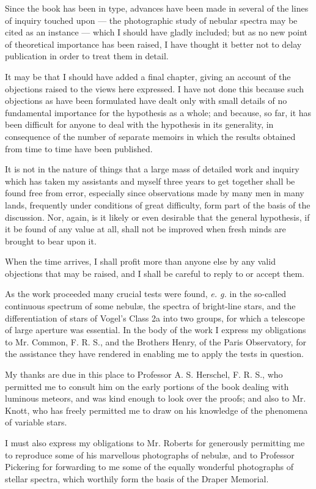 \documentclass[a4paper, 12pt, oneside, polutonikogreek, english]{article}
\begin{document}
Since the book has been in type, advances have been made in several of the lines of inquiry touched upon --- the photographic study of nebular spectra may be cited as an instance --- which I should have gladly included; but as no new point of theoretical importance has been raised, I have thought it better not to delay publication in order to treat them in detail.

It may be that I should have added a final chapter, giving an account of the objections raised to the views here expressed. I have not done this because such objections as have been formulated have dealt only with small details of no fundamental importance for the hypothesis as a whole; and because, so far, it has been difficult for anyone to deal with the hypothesis in its generality, in consequence of the number of separate memoirs in which the results obtained from time to time have been published.

It is not in the nature of things that a large mass of detailed work and inquiry which has taken my assistants and myself three years to get together shall be found free from error, especially since observations made by many men in many lands, frequently under conditions of great difficulty, form part of the basis of the discussion. Nor, again, is it likely or even desirable that the general hypothesis, if it be found of any value at all, shall not be improved when fresh minds are brought to bear upon it.

When the time arrives, I shall profit more than anyone else by any valid objections that may be raised, and I shall be careful to reply to or accept them.

As the work proceeded many crucial tests were found, \emph{e. g.} in the so-called continuous spectrum of some nebulæ, the spectra of bright-line stars, and the differentiation of stars of Vogel's Class 2a into two groups, for which a telescope of large aperture was essential. In the body of the work I express my obligations to Mr. Common, F. R. S., and the Brothers Henry, of the Paris Observatory, for the assistance they have rendered in enabling me to apply the tests in question.

My thanks are due in this place to Professor A. S. Herschel, F. R. S., who permitted me to consult him on the early portions of the book dealing with luminous meteors, and was kind enough to look over the proofs; and also to Mr. Knott, who has freely permitted me to draw on his knowledge of the phenomena of variable stars.

I must also express my obligations to Mr. Roberts for generously permitting me to reproduce some of his marvellous photographs of nebulæ, and to Professor Pickering for forwarding to me some of the equally wonderful photographs of stellar spectra, which worthily form the basis of the Draper Memorial.
\end{document}
